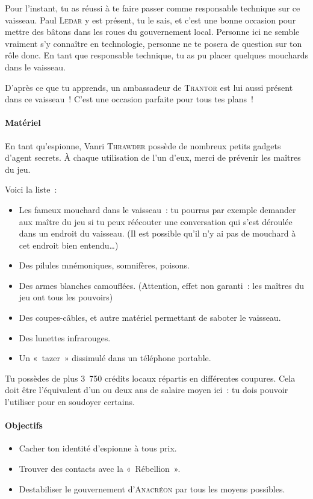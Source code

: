 {Pour l’instant, tu as réussi à te faire passer comme responsable technique sur ce vaisseau.
Paul \textsc{Ledar} y est présent, tu le sais, et c’est une bonne occasion pour mettre des bâtons dans les roues du gouvernement local.
Personne ici ne semble vraiment s’y connaître en technologie, personne ne te posera de question sur ton rôle donc.
En tant que responsable technique, tu as pu placer quelques mouchards dans le vaisseau.

D’après ce que tu apprends, un ambassadeur de \textsc{Trantor} est lui aussi présent dans ce vaisseau~!
C’est une occasion parfaite pour tous tes plans~!

\paragraph{Matériel}
{
En tant qu’espionne, Vanri \textsc{Thrawder} possède de nombreux petits gadgets d’agent secrets.
À chaque utilisation de l’un d’eux, merci de prévenir les maîtres du jeu.

Voici la liste~:
\begin{itemize}
	\item Les fameux mouchard dans le vaisseau~:  tu pourras par exemple demander aux maître du jeu si tu peux réécouter une conversation qui s’est déroulée dans un endroit du vaisseau. (Il est possible qu’il n’y ai pas de mouchard à cet endroit bien entendu…)
	\item Des pilules mnémoniques, somnifères, poisons.
	\item Des armes blanches camouflées.  (Attention, effet non garanti~:  les maîtres du jeu ont tous les pouvoirs)
	\item Des coupes-câbles, et autre matériel permettant de saboter le vaisseau.
	\item Des lunettes infrarouges.
	\item Un «~tazer~» dissimulé dans un téléphone portable.
\end{itemize}
}

Tu possèdes de plus 3~750 crédits locaux répartis en différentes coupures.
Cela doit être l’équivalent d’un ou deux ans de salaire moyen ici~:  tu dois pouvoir l’utiliser pour en soudoyer certains.

\paragraph{Objectifs}{
\begin{itemize}
	\item Cacher ton identité d’espionne à tous prix.
	\item Trouver des contacts avec la «~Rébellion~».
	\item Destabiliser le gouvernement d’\textsc{Anacréon} par tous les moyens possibles.
\end{itemize}
}
}



